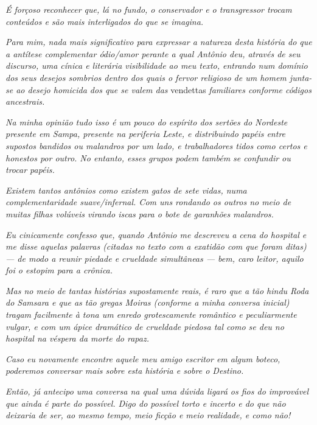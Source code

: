 \emph{É forçoso reconhecer que, lá no fundo, o conservador e o
transgressor trocam conteúdos e são mais interligados do que se
imagina.}

\emph{Para mim, nada mais significativo para expressar a natureza desta
história do que a antítese complementar ódio/amor perante a qual Antônio
deu, através de seu discurso, uma cínica e literária visibilidade ao meu
texto, entrando num domínio dos seus desejos sombrios dentro dos quais o
fervor religioso de um homem junta-se ao desejo homicida dos que se
valem das} vendettas \emph{familiares conforme códigos ancestrais.}

\emph{Na minha opinião tudo isso é um pouco do espírito dos sertões do
Nordeste presente em Sampa, presente na periferia Leste, e distribuindo
papéis entre supostos bandidos ou malandros por um lado, e trabalhadores
tidos como certos e honestos por outro. No entanto, esses grupos
podem também se confundir ou trocar papéis.}

\emph{Existem tantos antônios como existem gatos de sete vidas, numa
complementaridade suave/infernal. Com uns rondando os outros no meio de
muitas filhas volúveis virando iscas para o bote de garanhões
malandros.}

\emph{Eu cinicamente confesso que, quando Antônio me descreveu a cena do
hospital e me disse aquelas palavras (citadas no texto com a exatidão
com que foram ditas) --- de modo a reunir piedade e crueldade
simultâneas --- bem, caro leitor, aquilo foi o estopim para a crônica.}

\emph{Mas no meio de tantas histórias supostamente reais, é raro que a
tão hindu Roda do Samsara e que as tão gregas Moiras (conforme a minha
conversa inicial) tragam facilmente à tona um enredo grotescamente
romântico e peculiarmente vulgar, e com um ápice dramático de crueldade
piedosa tal como se deu no hospital na véspera da morte do rapaz.}

\emph{Caso eu novamente encontre aquele meu amigo escritor em algum
boteco, poderemos conversar mais sobre esta história e sobre o Destino.}

\emph{Então, já antecipo uma conversa na qual uma dúvida ligará os
fios do improvável que ainda é parte do possível. Digo do possível torto
e incerto e do que não deixaria de ser, ao mesmo tempo, meio ficção e meio
realidade, e como não!~}
\endgroup